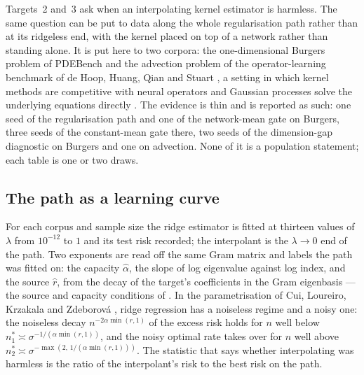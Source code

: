 \documentclass[11pt]{article}
\theoremstyle{definition}
\begin{document}
Targets~2 and~3 ask when an interpolating kernel estimator is harmless. The same question can be put
to data along the whole regularisation path rather than at its ridgeless end, with the kernel placed
on top of a network rather than standing alone. It is put here to two corpora: the one-dimensional
Burgers problem of PDEBench \cite{PDEBench} and the advection problem of the operator-learning
benchmark of de Hoop, Huang, Qian and Stuart \cite{deHoop}, a setting in which kernel methods are
competitive with neural operators \cite{BatlleDarcyHosseiniOwhadi} and Gaussian processes solve the
underlying equations directly \cite{ChenHosseiniOwhadiStuart}. The evidence is thin and is reported as
such: one seed of the regularisation path and one of the network-mean gate on Burgers, three seeds
of the constant-mean gate there, two seeds of the dimension-gap diagnostic on Burgers and one on
advection. None of it is a population statement; each table is one or two draws.

\subsection{The path as a learning curve}

For each corpus and sample size the ridge estimator is fitted at thirteen values of $\lambda$ from
$10^{-12}$ to $1$ and its test risk recorded; the interpolant is the $\lambda\to0$ end of the path.
Two exponents are read off the same Gram matrix and labels the path was fitted on: the capacity
$\hat\alpha$, the slope of log eigenvalue against log index, and the source $\hat r$, from the decay
of the target's coefficients in the Gram eigenbasis --- the source and capacity conditions of
\cite{CaponnettoDeVito}. In the parametrisation of Cui, Loureiro, Krzakala and Zdeborov\'a
\cite{Cui}, ridge regression has a noiseless regime and a noisy one: the noiseless decay
$n^{-2\alpha\min(r,1)}$ of the excess risk holds for $n$ well below
$n_1^*\asymp\sigma^{-1/(\alpha\min(r,1))}$, and the noisy optimal rate takes over for $n$ well
above $n_2^*\asymp\sigma^{-\max(2,\,1/(\alpha\min(r,1)))}$. The statistic that says whether
interpolating was harmless is the ratio of the interpolant's risk to the best risk on the path.
\end{document}
